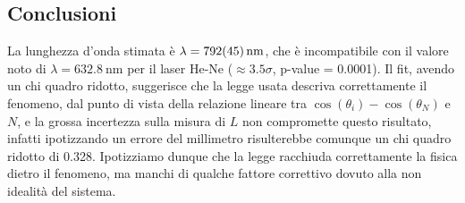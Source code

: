 \documentclass[a4paper]{article}
\begin{document}
\subsection{Conclusioni}
La lunghezza d'onda stimata è $\lambda = \SI{792 \pm 45}{\nano\meter}$, che è incompatibile con il valore noto di $\lambda = \SI{632.8}{\nano\meter}$ per il laser He-Ne ($\approx 3.5 \sigma$, p-value = 0.0001). Il fit, avendo un chi quadro ridotto, suggerisce che la legge usata descriva correttamente il fenomeno, dal punto di vista della relazione lineare tra $\cos(\theta_i) - \cos(\theta_N)$ e $N$, e la grossa incertezza sulla misura di $L$ non compromette questo risultato, infatti ipotizzando un errore del millimetro risulterebbe comunque un chi quadro ridotto di 0.328. Ipotizziamo dunque che la legge racchiuda correttamente la fisica dietro il fenomeno, ma manchi di qualche fattore correttivo dovuto alla non idealità del sistema. 
\end{document}
